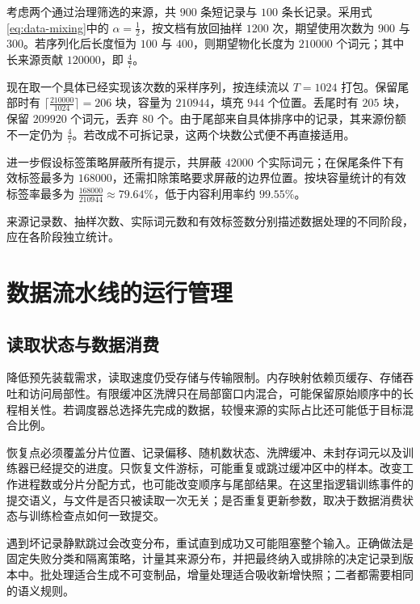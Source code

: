 \documentclass[../textbook.tex]{subfiles}
\begin{document}
\begin{example}[从来源采样到有效监督词元]
考虑两个通过治理筛选的来源，共 $900$ 条短记录与 $100$ 条长记录。采用式\eqref{eq:data-mixing}中的 $\alpha=\frac{1}{2}$，按文档有放回抽样 $1200$ 次，期望使用次数为 $900$ 与 $300$。若序列化后长度恒为 $100$ 与 $400$，则期望物化长度为 $210000$ 个词元；其中长来源贡献 $120000$，即 $\frac{4}{7}$。

现在取一个具体已经实现该次数的采样序列，按连续流以 $T=1024$ 打包。保留尾部时有 $\lceil\frac{210000}{1024}\rceil=206$ 块，容量为 $210944$，填充 $944$ 个位置。丢尾时有 $205$ 块，保留 $209920$ 个词元，丢弃 $80$ 个。由于尾部来自具体排序中的记录，其来源份额不一定仍为 $\frac{4}{7}$。若改成不可拆记录，这两个块数公式便不再直接适用。

进一步假设标签策略屏蔽所有提示，共屏蔽 $42000$ 个实际词元；在保尾条件下有效标签最多为 $168000$，还需扣除策略要求屏蔽的边界位置。按块容量统计的有效标签率最多为 $\frac{168000}{210944}\approx79.64\%$，低于内容利用率约 $99.55\%$。

来源记录数、抽样次数、实际词元数和有效标签数分别描述数据处理的不同阶段，应在各阶段独立统计。
\end{example}

\section{数据流水线的运行管理}

\subsection{读取状态与数据消费}
降低预先装载需求，读取速度仍受存储与传输限制。内存映射依赖页缓存、存储吞吐和访问局部性。有限缓冲区洗牌只在局部窗口内混合，可能保留原始顺序中的长程相关性。若调度器总选择先完成的数据，较慢来源的实际占比还可能低于目标混合比例。

恢复点必须覆盖分片位置、记录偏移、随机数状态、洗牌缓冲、未封存词元以及训练器已经提交的进度。只恢复文件游标，可能重复或跳过缓冲区中的样本。改变工作进程数或分片分配方式，也可能改变顺序与尾部结果。在这里指逻辑训练事件的提交语义，与文件是否只被读取一次无关；是否重复更新参数，取决于数据消费状态与训练检查点如何一致提交。

遇到坏记录静默跳过会改变分布，重试直到成功又可能阻塞整个输入。正确做法是固定失败分类和隔离策略，计量其来源分布，并把最终纳入或排除的决定记录到版本中。批处理适合生成不可变制品，增量处理适合吸收新增快照；二者都需要相同的语义规则。
\end{document}
